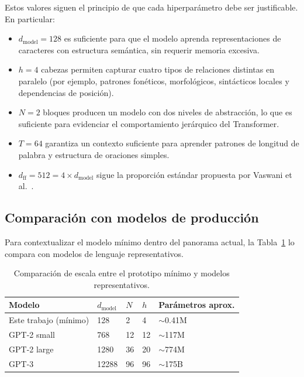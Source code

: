 Estos valores siguen el principio de que cada hiperparámetro debe ser
justificable. En particular:

\begin{itemize}
    \item $d_{\text{model}} = 128$ es suficiente para que el modelo
    aprenda representaciones de caracteres con estructura semántica,
    sin requerir memoria excesiva.

    \item $h = 4$ cabezas permiten capturar cuatro tipos de relaciones
    distintas en paralelo (por ejemplo, patrones fonéticos, morfológicos,
    sintácticos locales y dependencias de posición).

    \item $N = 2$ bloques producen un modelo con dos niveles de
    abstracción, lo que es suficiente para evidenciar el comportamiento
    jerárquico del Transformer.

    \item $T = 64$ garantiza un contexto suficiente para aprender
    patrones de longitud de palabra y estructura de oraciones simples.

    \item $d_{\text{ff}} = 512 = 4 \times d_{\text{model}}$ sigue la
    proporción estándar propuesta por Vaswani et al.~\cite{vaswani2017attention}.
\end{itemize}

\subsection{Comparación con modelos de producción}
\label{subsec:comparacion_escala}

Para contextualizar el modelo mínimo dentro del panorama actual, la
Tabla~\ref{tab:escala} lo compara con modelos de lenguaje representativos.

\begin{table}[H]
\centering
\caption{Comparación de escala entre el prototipo mínimo y modelos representativos.}
\label{tab:escala}
\begin{tabularx}{\textwidth}{lXXXX}
\toprule
\textbf{Modelo} & \textbf{$d_{\text{model}}$} & \textbf{$N$} & \textbf{$h$} & \textbf{Parámetros aprox.} \\
\midrule
Este trabajo (mínimo) & 128  & 2  & 4   & $\sim$0.41M \\
GPT-2 small           & 768  & 12 & 12  & $\sim$117M \\
GPT-2 large           & 1280 & 36 & 20  & $\sim$774M \\
GPT-3                 & 12288 & 96 & 96 & $\sim$175B \\
\bottomrule
\end{tabularx}
\end{table}

